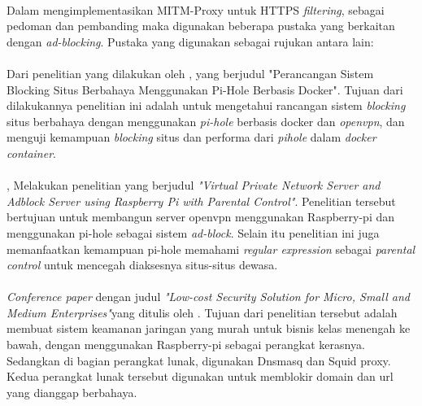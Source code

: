 \documentclass[../PROPOSAL_PRA_SKRIPSI_ALDZIKRI_DWIJAYANTO_PRATHAMA.tex]{subfiles}
\begin{document}
  \paragraph*{}Dalam mengimplementasikan MITM-Proxy untuk
  HTTPS \textit{filtering}, sebagai pedoman dan pembanding
  maka digunakan beberapa pustaka yang berkaitan dengan
  \textit{ad-blocking}. Pustaka yang digunakan sebagai
  rujukan antara lain:

  \paragraph*{} Dari penelitian yang dilakukan oleh
  \cite{uni2021}, yang berjudul "Perancangan Sistem Blocking
  Situs Berbahaya Menggunakan Pi-Hole Berbasis Docker".
  Tujuan dari dilakukannya penelitian ini adalah untuk
  mengetahui rancangan sistem \textit{blocking} situs
  berbahaya dengan menggunakan \textit{pi-hole} berbasis
  docker dan \textit{openvpn}, dan menguji kemampuan
  \textit{blocking} situs dan performa dari \textit{pihole}
  dalam \textit{docker container}.

  \paragraph*{} \cite{yusoff2020}, Melakukan penelitian yang
  berjudul \textit{"Virtual Private Network Server and
  Adblock Server using Raspberry Pi with Parental
  Control"}. Penelitian tersebut bertujuan untuk membangun
  server openvpn menggunakan Raspberry-pi dan menggunakan
  pi-hole sebagai sistem \textit{ad-block}. Selain itu
  penelitian ini juga memanfaatkan kemampuan pi-hole
  memahami \textit{regular expression} sebagai
  \textit{parental control} untuk mencegah diaksesnya
  situs-situs dewasa.

  \paragraph*{} \textit{Conference paper} dengan judul
  \textit{"Low-cost Security Solution for Micro, Small and
  Medium Enterprises"}yang ditulis oleh \cite{sarath2020}.
  Tujuan dari penelitian tersebut adalah membuat sistem
  keamanan jaringan yang murah untuk bisnis kelas menengah
  ke bawah, dengan menggunakan Raspberry-pi sebagai
  perangkat kerasnya. Sedangkan di bagian perangkat lunak,
  digunakan Dnsmasq dan Squid proxy. Kedua perangkat lunak
  tersebut digunakan untuk memblokir domain dan url yang
  dianggap berbahaya.
\end{document}
